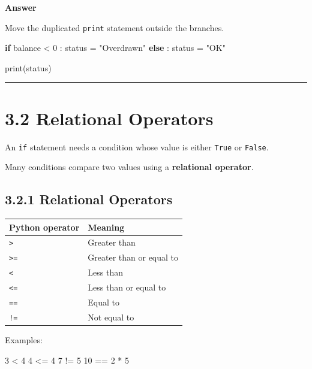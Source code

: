 \documentclass[
  11pt,
  a4paper,
]{article}
\newenvironment{Shaded}{}{}
\newcommand{\BuiltInTok}[1]{\textcolor[rgb]{0.00,0.50,0.00}{#1}}
\newcommand{\ControlFlowTok}[1]{\textcolor[rgb]{0.00,0.44,0.13}{\textbf{#1}}}
\newcommand{\DecValTok}[1]{\textcolor[rgb]{0.25,0.63,0.44}{#1}}
\newcommand{\NormalTok}[1]{#1}
\newcommand{\OperatorTok}[1]{\textcolor[rgb]{0.40,0.40,0.40}{#1}}
\newcommand{\StringTok}[1]{\textcolor[rgb]{0.25,0.44,0.63}{#1}}
\begin{document}
\textbf{Answer}

Move the duplicated \texttt{print} statement outside the branches.

\begin{Shaded}
\begin{Highlighting}[]
\ControlFlowTok{if}\NormalTok{ balance }\OperatorTok{\textless{}} \DecValTok{0}\NormalTok{ :}
\NormalTok{    status }\OperatorTok{=} \StringTok{"Overdrawn"}
\ControlFlowTok{else}\NormalTok{ :}
\NormalTok{    status }\OperatorTok{=} \StringTok{"OK"}

\BuiltInTok{print}\NormalTok{(status)}
\end{Highlighting}
\end{Shaded}

\begin{center}\rule{0.5\linewidth}{0.5pt}\end{center}

\section{3.2 Relational Operators}\label{relational-operators}

An \texttt{if} statement needs a condition whose value is either
\texttt{True} or \texttt{False}.

Many conditions compare two values using a \textbf{relational operator}.

\subsection{3.2.1 Relational Operators}\label{relational-operators-1}

\begin{longtable}[]{@{}ll@{}}
\toprule\noalign{}
Python operator & Meaning \\
\midrule\noalign{}
\endhead
\bottomrule\noalign{}
\endlastfoot
\texttt{\textgreater{}} & Greater than \\
\texttt{\textgreater{}=} & Greater than or equal to \\
\texttt{\textless{}} & Less than \\
\texttt{\textless{}=} & Less than or equal to \\
\texttt{==} & Equal to \\
\texttt{!=} & Not equal to \\
\end{longtable}

Examples:

\begin{Shaded}
\begin{Highlighting}[]
\DecValTok{3} \OperatorTok{\textless{}} \DecValTok{4}
\DecValTok{4} \OperatorTok{\textless{}=} \DecValTok{4}
\DecValTok{7} \OperatorTok{!=} \DecValTok{5}
\DecValTok{10} \OperatorTok{==} \DecValTok{2} \OperatorTok{*} \DecValTok{5}
\end{Highlighting}
\end{Shaded}
\end{document}
